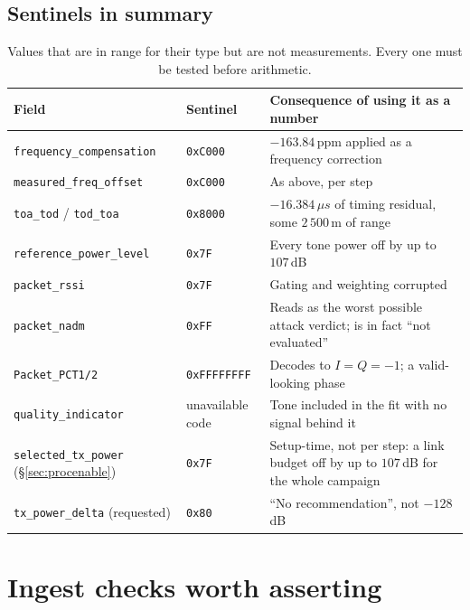 \documentclass[11pt,a4paper]{article}
\newcommand{\us}{\,\ensuremath{\upmu}s}
\newcommand{\code}[1]{\texttt{\small #1}}
\providecommand{\upmu}{\mu}
\begin{document}
\subsection{Sentinels in summary}

\begin{table}[h]
\caption{Values that are in range for their type but are not measurements. Every one must be tested
before arithmetic.}
\label{tab:sentinels}
\centering\scriptsize
\begin{tabular}{@{}L{40mm}L{22mm}L{68mm}@{}}
\toprule
Field & Sentinel & Consequence of using it as a number \\
\midrule
\code{frequency\_\allowbreak{}compensation} & \code{0xC000} & $-163.84$\,ppm applied as a frequency correction \\
\code{measured\_\allowbreak{}freq\_\allowbreak{}offset} & \code{0xC000} & As above, per step \\
\code{toa\_\allowbreak{}tod} / \code{tod\_\allowbreak{}toa} & \code{0x8000} & $-16.384\us$ of timing residual, some $2\,500$\,m of range \\
\code{reference\_\allowbreak{}power\_\allowbreak{}level} & \code{0x7F} & Every tone power off by up to $107$\,dB \\
\code{packet\_\allowbreak{}rssi} & \code{0x7F} & Gating and weighting corrupted \\
\code{packet\_\allowbreak{}nadm} & \code{0xFF} & Reads as the worst possible attack verdict; is in fact ``not evaluated'' \\
\code{Packet\_\allowbreak{}PCT1/2} & \code{0xFFFFFFFF} & Decodes to $I=Q=-1$; a valid-looking phase \\
\code{quality\_\allowbreak{}indicator} & unavailable code & Tone included in the fit with no signal behind it \\
\code{selected\_\allowbreak{}tx\_\allowbreak{}power} (\S\ref{sec:procenable}) & \code{0x7F} & Setup-time, not per step: a link budget off by up to $107$\,dB for the whole campaign \\
\code{tx\_\allowbreak{}power\_\allowbreak{}delta} (requested) & \code{0x80} & ``No recommendation'', not $-128$\,dB \\
\bottomrule
\end{tabular}
\end{table}

\section{Ingest checks worth asserting}
\end{document}
